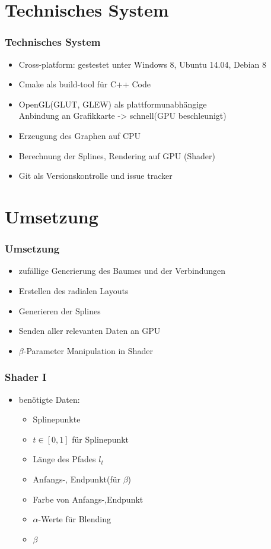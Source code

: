 \documentclass[11pt]{beamer}
\begin{document}
\section{Technisches System}
\begin{frame}
\frametitle{Technisches System}

\begin{itemize}
\item Cross-platform: gestestet unter Windows 8, Ubuntu 14.04, Debian 8
\item Cmake als build-tool für C++ Code
\item OpenGL(GLUT, GLEW) als plattformunabhängige  
\\ Anbindung an Grafikkarte -> schnell(GPU beschleunigt) 
\item Erzeugung des Graphen auf CPU
\item Berechnung der Splines, Rendering auf GPU (Shader)
\item Git als Versionskontrolle und issue tracker
\end{itemize}

\end{frame}

\section{Umsetzung}
\begin{frame}
\frametitle{Umsetzung}

\begin{itemize}
\item zufällige Generierung des Baumes und der Verbindungen
\item Erstellen des radialen Layouts
\item Generieren der Splines
\item Senden aller relevanten Daten an GPU
\item $\beta$-Parameter Manipulation in Shader
\end{itemize}
\end{frame}

\begin{frame}
\frametitle{Shader I}
\begin{itemize}
\item benötigte Daten: 	
	\begin{itemize}
	\item Splinepunkte
	\item $t \in[0,1]$ für Splinepunkt
	\item Länge des Pfades $l_t$
	\item Anfangs-, Endpunkt(für $\beta$)
	\item Farbe von Anfangs-,Endpunkt
	\item $\alpha$-Werte für Blending
	\item $\beta$
	\end{itemize}
\end{itemize}

\end{frame}
\end{document}
